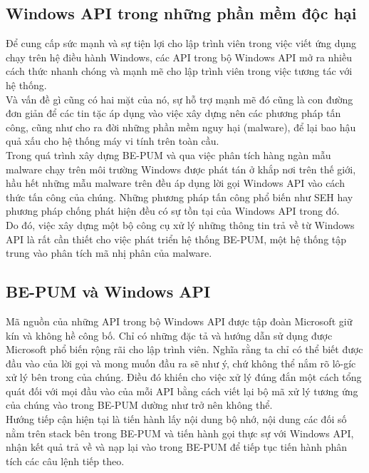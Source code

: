 	\subsection{Windows API trong những phần mềm độc hại}

Để cung cấp sức mạnh và sự tiện lợi cho lập trình viên trong việc viết ứng dụng chạy trên hệ điều hành Windows, các API trong bộ Windows API mở ra nhiều cách thức nhanh chóng và mạnh mẽ cho lập trình viên trong việc tương tác với hệ thống.\\

Và vấn đề gì cũng có hai mặt của nó, sự hỗ trợ mạnh mẽ đó cũng là con đường đơn giản để các tin tặc áp dụng vào việc xây dựng nên các phương pháp tấn công, cũng như cho ra đời những phần mềm nguy hại (malware), để lại bao hậu quả xấu cho hệ thống máy vi tính trên toàn cầu.\\

Trong quá trình xây dựng BE-PUM và qua việc phân tích hàng ngàn mẫu malware chạy trên môi trường Windows được phát tán ở khắp nơi trên thế giới, hầu hết những mẫu malware trên đều áp dụng lời gọi Windows API vào cách thức tấn công của chúng. Những phương pháp tấn công phổ biến như SEH hay phương pháp chống phát hiện đều có sự tồn tại của Windows API trong đó.\\

Do đó, việc xây dựng một bộ công cụ xử lý những thông tin trả về từ Windows API là rất cần thiết cho việc phát triển hệ thống BE-PUM, một hệ thống tập trung vào phân tích mã nhị phân của malware.\\




	\subsection{BE-PUM và Windows API}

Mã nguồn của những API trong bộ Windows API được tập đoàn Microsoft giữ kín và không hề công bố. Chỉ có những đặc tả và hướng dẫn sử dụng được Microsoft phổ biến rộng rãi cho lập trình viên. Nghĩa rằng ta chỉ có thể biết được đầu vào của lời gọi và mong muốn đầu ra sẽ như ý, chứ không thể nắm rõ lô-gíc xử lý bên trong của chúng. Điều đó khiến cho việc xử lý đúng đắn một cách tổng quát đối với mọi đầu vào của mỗi API bằng cách viết lại bộ mã xử lý tương ứng của chúng vào trong BE-PUM dường như trở nên không thể.\\

Hướng tiếp cận hiện tại là tiến hành lấy nội dung bộ nhớ, nội dung các đối số nằm trên stack bên trong BE-PUM và tiến hành gọi thực sự với Windows API, nhận kết quả trả về và nạp lại vào trong BE-PUM để tiếp tục tiến hành phân tích các câu lệnh tiếp theo.\\

